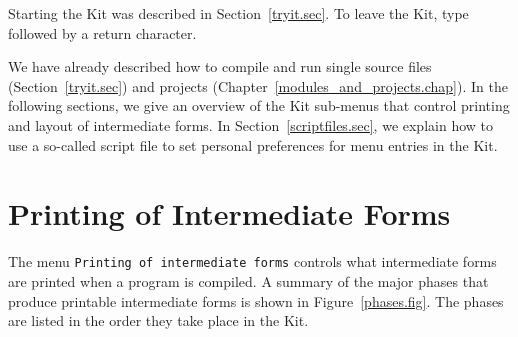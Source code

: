 \documentclass[12pt]{book}
\begin{document}
\label{controlkit.sec}
\label{startup.sec}
Starting the Kit was described in Section~\ref{tryit.sec}.  To
%
%
%
leave the Kit, type  followed by a
return character. 

We have already described how to compile and run single source files
(Section~\ref{tryit.sec}) and projects
(Chapter~\ref{modules_and_projects.chap}).  In the following sections,
we give an overview of the Kit sub-menus that control printing and
layout of intermediate forms. In Section~\ref{scriptfiles.sec}, we
explain how to use a so-called script file to set personal preferences
for menu entries in the Kit.



%
\section{Printing of Intermediate Forms}
\label{printing_intermediate_forms.sec}
%
The menu 
%
\texttt{Printing of intermediate forms} controls what intermediate
forms are printed when a program is compiled.
A summary of the major phases that produce printable intermediate
forms is shown in Figure~\ref{phases.fig}. The phases are listed in
the order they take place in the Kit.
\end{document}
